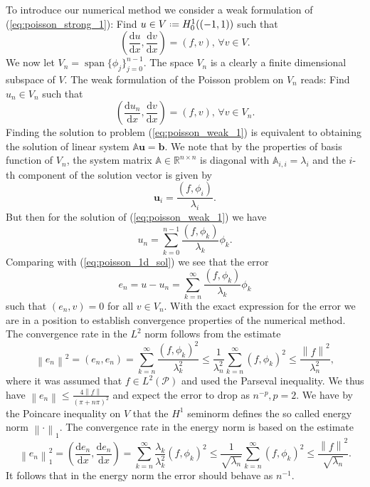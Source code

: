\documentclass[a4paper,10pt]{article}
\newcommand{\R}{\ensuremath{\mathbb{R}}}
\newcommand{\norm}[1]{\ensuremath{\left\|#1\right\|}}
\newcommand{\inner}[2]{\ensuremath{\left(#1, #2\right)}}
\newcommand{\deriv}[2]{\ensuremath{\frac{\mathrm{d}#1}{\mathrm{d}#2}}}
\newcommand*{\defeq}{\mathrel{\vcenter{\baselineskip0.5ex \lineskiplimit0pt
                     \hbox{\scriptsize.}\hbox{\scriptsize.}}}%
                     =}
\DeclareMathOperator{\spn}{span}
\begin{document}
  To introduce our numerical method we consider a weak formulation of
  (\ref{eq:poisson_strong_1}): Find $u\in V\defeq H^1_0((-1, 1))$ such that
  \[
    \inner{\deriv{u}{x}}{\deriv{v}{x}} = \inner{f}{v},\,\forall v\in V.
  \]
  We now let $V_n=\spn\{\phi_j\}_{j=0}^{n-1}$. The space $V_n$
  is a clearly a finite dimensional subspace of $V$. The weak formulation of
  the Poisson problem on $V_n$ reads: Find $u_n\in V_n$ such that
  \begin{equation}
    \label{eq:poisson_weak_1}
    \inner{\deriv{u_n}{x}}{\deriv{v}{x}} = \inner{f}{v},\,\forall v\in V_n.
  \end{equation}
  Finding the solution to problem (\ref{eq:poisson_weak_1}) is equivalent to
  obtaining the solution of linear system $\mathbb{A}\mathbf{u}=\mathbf{b}$.
  We note that by the properties of basis function of $V_n$, the system matrix
  $\mathbb{A}\in\R^{n\times n}$ is diagonal with $\mathbb{A}_{i, i}=\lambda_i$
  and the $i$-th component of the solution vector is given by
  \[
    \mathbf{u}_i = \frac{\inner{f}{\phi_i}}{\lambda_i}.
  \]
  But then for the solution of (\ref{eq:poisson_weak_1}) we have
  \[
    u_n = \sum_{k=0}^{n-1} \frac{\inner{f}{\phi_k}}{\lambda_k} \phi_k.
  \]
  Comparing with (\ref{eq:poisson_1d_sol}) we see that the error
  \[
    e_n=u-u_n = \sum_{k=n}^{\infty} \frac{\inner{f}{\phi_k}}{\lambda_k} \phi_k
  \]
  such that $(e_n, v)=0$ for all $v\in V_n$. With the exact expression for the
  error we are in a position to establish convergence properties of the
  numerical method. The convergence rate in the $L^2$ norm follows from the
  estimate
  \[
    \norm{e_n}^2=\inner{e_n}{e_n} = \sum_{k=n}^{\infty} \frac{\inner{f}{\phi_k}^2}{\lambda^2_k} \leq
    \frac{1}{\lambda^2_n}\sum_{k=n}^{\infty} \inner{f}{\phi_k}^2 \leq
    \frac{\norm{f}^2}{\lambda^2_n},
  \]
  where it was assumed that $f\in L^2\left(\mathcal{P}\right)$ and used the 
  Parseval inequality. We thus have $\norm{e_n}\leq\frac{4\norm{f}}{\left(\pi +
  n\pi\right)^2}$ and expect the error to drop as
  $n^{-p}, p=2$. We have by the Poincare inequality on $V$ that the $H^1$ seminorm
  defines the so called energy norm $\norm{\cdot}_1$. The convergence rate in
  the energy norm is based on the estimate
  \[
    \norm{e_n}^2_1=\inner{\deriv{e_n}{x}}{\deriv{e_n}{x}} =
    \sum_{k=n}^{\infty} \frac{\lambda_k}{\lambda^2_k}(f, \phi_k)^2 \leq
    \frac{1}{\sqrt{\lambda_n}}\sum_{k=n}^{\infty} (f, \phi_k)^2 \leq
    \frac{\norm{f}^2}{\sqrt{\lambda_n}}.
  \]
  It follows that in the energy norm the error should behave as $n^{-1}$.
\end{document}
